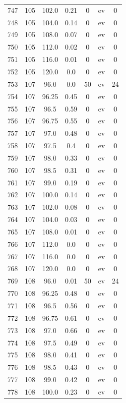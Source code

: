 \documentclass[12pt,a4paper]{article}
\begin{document}
\begin{tabular}{r|cccccc}
	747 & 105 & 102.0 & 0.21 & 0 & ev & 0 \\
	748 & 105 & 104.0 & 0.14 & 0 & ev & 0 \\
	749 & 105 & 108.0 & 0.07 & 0 & ev & 0 \\
	750 & 105 & 112.0 & 0.02 & 0 & ev & 0 \\
	751 & 105 & 116.0 & 0.01 & 0 & ev & 0 \\
	752 & 105 & 120.0 & 0.0 & 0 & ev & 0 \\
	753 & 107 & 96.0 & 0.0 & 50 & ev & 24 \\
	754 & 107 & 96.25 & 0.45 & 0 & ev & 0 \\
	755 & 107 & 96.5 & 0.59 & 0 & ev & 0 \\
	756 & 107 & 96.75 & 0.55 & 0 & ev & 0 \\
	757 & 107 & 97.0 & 0.48 & 0 & ev & 0 \\
	758 & 107 & 97.5 & 0.4 & 0 & ev & 0 \\
	759 & 107 & 98.0 & 0.33 & 0 & ev & 0 \\
	760 & 107 & 98.5 & 0.31 & 0 & ev & 0 \\
	761 & 107 & 99.0 & 0.19 & 0 & ev & 0 \\
	762 & 107 & 100.0 & 0.14 & 0 & ev & 0 \\
	763 & 107 & 102.0 & 0.08 & 0 & ev & 0 \\
	764 & 107 & 104.0 & 0.03 & 0 & ev & 0 \\
	765 & 107 & 108.0 & 0.01 & 0 & ev & 0 \\
	766 & 107 & 112.0 & 0.0 & 0 & ev & 0 \\
	767 & 107 & 116.0 & 0.0 & 0 & ev & 0 \\
	768 & 107 & 120.0 & 0.0 & 0 & ev & 0 \\
	769 & 108 & 96.0 & 0.01 & 50 & ev & 24 \\
	770 & 108 & 96.25 & 0.48 & 0 & ev & 0 \\
	771 & 108 & 96.5 & 0.56 & 0 & ev & 0 \\
	772 & 108 & 96.75 & 0.61 & 0 & ev & 0 \\
	773 & 108 & 97.0 & 0.66 & 0 & ev & 0 \\
	774 & 108 & 97.5 & 0.49 & 0 & ev & 0 \\
	775 & 108 & 98.0 & 0.41 & 0 & ev & 0 \\
	776 & 108 & 98.5 & 0.43 & 0 & ev & 0 \\
	777 & 108 & 99.0 & 0.42 & 0 & ev & 0 \\
	778 & 108 & 100.0 & 0.23 & 0 & ev & 0 \\

\end{tabular}
\end{document}

